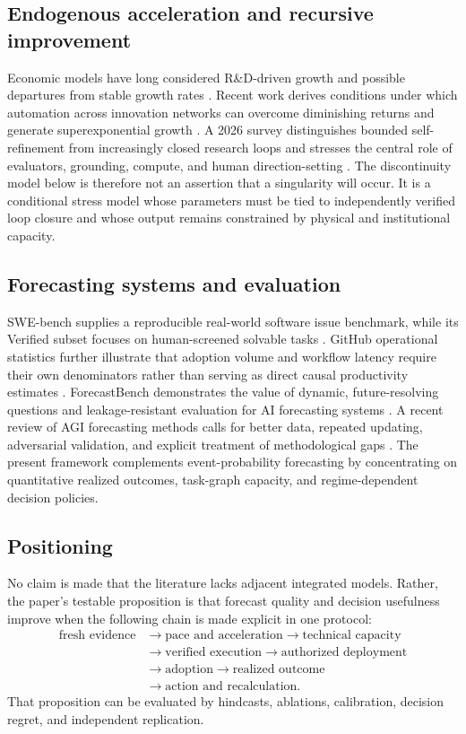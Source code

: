 \subsection{Endogenous acceleration and recursive improvement}

Economic models have long considered R\&D-driven growth and possible departures from stable growth rates \citep{jones1995,nordhaus2021,trammell2023}. Recent work derives conditions under which automation across innovation networks can overcome diminishing returns and generate superexponential growth \citep{davidson2026}. A 2026 survey distinguishes bounded self-refinement from increasingly closed research loops and stresses the central role of evaluators, grounding, compute, and human direction-setting \citep{chen2026rsi}. The discontinuity model below is therefore not an assertion that a singularity will occur. It is a conditional stress model whose parameters must be tied to independently verified loop closure and whose output remains constrained by physical and institutional capacity.

\subsection{Forecasting systems and evaluation}

SWE-bench supplies a reproducible real-world software issue benchmark, while its Verified subset focuses on human-screened solvable tasks \citep{jimenez2024,swebench2026}. GitHub operational statistics further illustrate that adoption volume and workflow latency require their own denominators rather than serving as direct causal productivity estimates \citep{githuboctoverse2025,githubagent2026}. ForecastBench demonstrates the value of dynamic, future-resolving questions and leakage-resistant evaluation for AI forecasting systems \citep{karger2024}. A recent review of AGI forecasting methods calls for better data, repeated updating, adversarial validation, and explicit treatment of methodological gaps \citep{sarma2026}. The present framework complements event-probability forecasting by concentrating on quantitative realized outcomes, task-graph capacity, and regime-dependent decision policies.

\subsection{Positioning}

No claim is made that the literature lacks adjacent integrated models. Rather, the paper's testable proposition is that forecast quality and decision usefulness improve when the following chain is made explicit in one protocol:
\[
\begin{aligned}
\text{fresh evidence}&\rightarrow\text{pace and acceleration}\rightarrow\text{technical capacity}\\
&\rightarrow\text{verified execution}\rightarrow\text{authorized deployment}\\
&\rightarrow\text{adoption}\rightarrow\text{realized outcome}\\
&\rightarrow\text{action and recalculation}.
\end{aligned}
\]
That proposition can be evaluated by hindcasts, ablations, calibration, decision regret, and independent replication.
